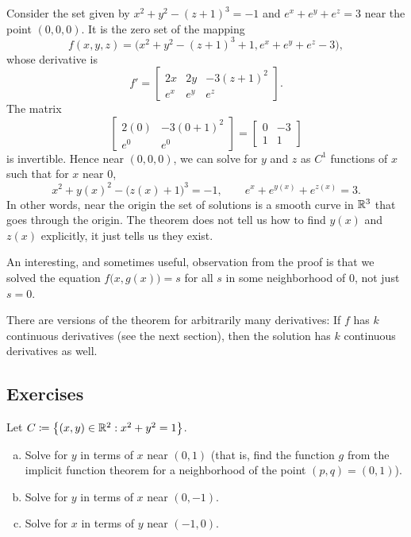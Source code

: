 \begin{example}
Consider the set given by $x^2+y^2-{(z+1)}^3 = -1$ and $e^x+e^y+e^z = 3$
near the point $(0,0,0)$.
It is the zero set of the mapping
\begin{equation*}
f(x,y,z) = \bigl(x^2+y^2-{(z+1)}^3+1,e^x+e^y+e^z-3\bigr) ,
\end{equation*}
whose derivative is
\begin{equation*}
f' =
\begin{bmatrix}
2x & 2y & -3{(z+1)}^2 \\
e^x & e^y & e^z
\end{bmatrix} .
\end{equation*}
The matrix
\begin{equation*}
\begin{bmatrix}
2(0) & -3{(0+1)}^2 \\
e^0 & e^0
\end{bmatrix}
=
\begin{bmatrix}
0 & -3 \\
1 & 1
\end{bmatrix}
\end{equation*}
is invertible.  Hence near $(0,0,0)$, we can solve for $y$ and $z$
as $C^1$ functions of $x$ such that for $x$ near $0$,
\begin{equation*}
x^2+y(x)^2-{\bigl(z(x)+1\bigr)}^3 = -1,
\qquad
e^x+e^{y(x)}+e^{z(x)} = 3 .
\end{equation*}
In other words, near the origin the set of solutions is a
smooth curve in ${\mathbb{R}}^3$ that goes through the origin.
The theorem does not tell us how to find $y(x)$ and $z(x)$ explicitly,
it just tells us they exist.
\end{example}

An interesting, and sometimes useful, observation from the proof is that we solved the equation
$f\bigl(x,g(x)\bigr) = s$ for all $s$ in some neighborhood of $0$, not just
$s=0$.

\begin{remark}
There are versions of the theorem for arbitrarily many derivatives:
If $f$ has $k$ continuous derivatives (see the next section), then the solution has $k$
continuous derivatives as well.
\end{remark}


\subsection{Exercises}

\begin{exercise}
Let $C \coloneqq \bigl\{ (x,y) \in {\mathbb{R}}^2 : x^2+y^2 = 1 \bigr\}$.
\begin{enumerate}[a)]
\item
Solve for $y$ in terms of $x$ near $(0,1)$ (that is, find the function $g$
from the implicit function theorem for a neighborhood of the point $(p,q) = (0,1)$).
\item
Solve for $y$ in terms of $x$ near $(0,-1)$.
\item
Solve for $x$ in terms of $y$ near $(-1,0)$.
\end{enumerate}
\end{exercise}

